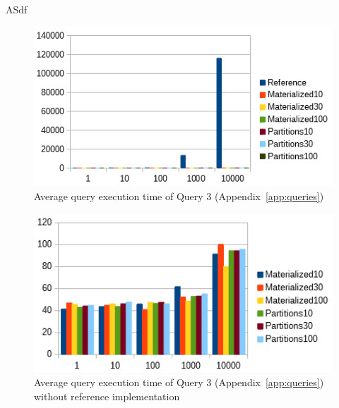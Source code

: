 ASdf
\begin{figure}[h]
    \centering
    \includegraphics[scale=0.9]{charts/Query3.png}
    \caption{Average query execution time of Query 3 (Appendix~\ref{app:queries})}
    \label{fig:query3}
\end{figure}

\begin{figure}[h]
    \centering
    \includegraphics[scale=0.9]{charts/Query3WithoutReference.png}
    \caption{Average query execution time of Query 3 (Appendix~\ref{app:queries}) without reference implementation}
    \label{fig:query3withoutref}
\end{figure}